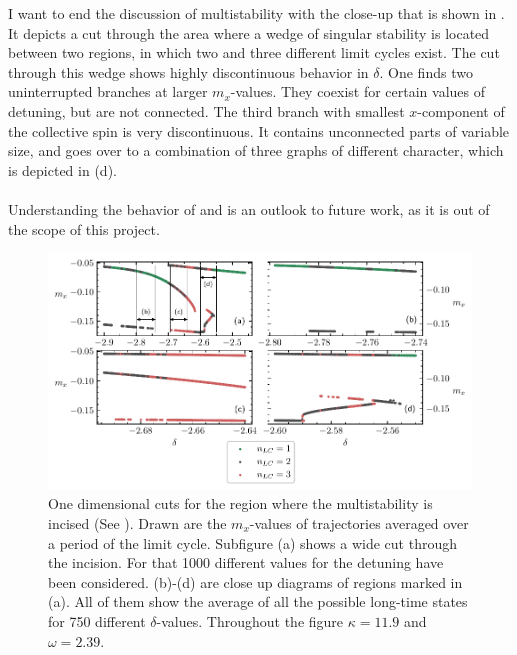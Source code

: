 I want to end the discussion of multistability with the close-up that is shown in . It depicts a cut through the area where a wedge of singular stability is  located between two regions, in which two and three different limit cycles exist. The cut through this wedge shows highly discontinuous behavior in $\delta$. One finds two uninterrupted branches at larger $m_x$-values. They coexist for certain values of detuning, but are not connected. The third branch with smallest $x$-component of the collective spin is very discontinuous. It contains unconnected parts of variable size, and goes over to a combination of three graphs of different character, which is depicted in (d). \\\\Understanding the behavior of  and  is an outlook to future work, as it is out of the scope of this project.
\begin{figure}[H]
    \hspace*{-1.2cm}
    \includegraphics{pictures/multistab_line_bay.pdf}
    \caption{One dimensional cuts for the region where the multistability is incised (See ). Drawn are the $m_x$-values of trajectories averaged over a period of the limit cycle. Subfigure (a) shows a wide cut through the incision. For that 1000 different values for the detuning have been considered. (b)-(d) are close up diagrams of regions marked in (a). All of them show the average of all the possible long-time states for 750 different $\delta$-values. Throughout the figure $\kappa=11.9$ and $\omega=2.39$.}
    \label{fig:delcut_bay}
\end{figure}
